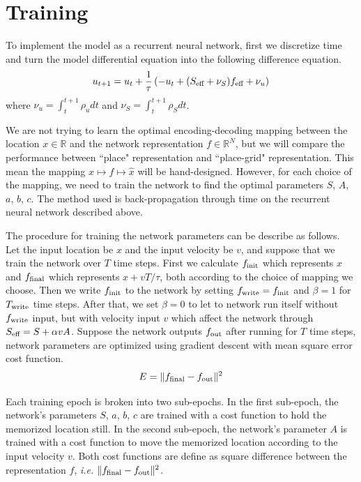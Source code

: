 \section{Training}
\label{sec:train}

To implement the model as a recurrent neural network, first we discretize time and turn the model differential equation into the following difference equation.
\begin{equation}
u_{t+1} = u_{t} + \frac{1}{\tau} \left(
    -u_{t} + (S_{\text{\scriptsize{eff}}} + \nu_S)
    f_{\text{\scriptsize{eff}}} + \nu_u
	\right)
\end{equation}
where $\nu_u = \int_{t}^{t+1} \rho_u dt$ and $\nu_S = \int_{t}^{t+1} \rho_S dt$.

We are not trying to learn the optimal encoding-decoding mapping between the location $x \in \mathbb{R}$ and the network representation $f \in \mathbb{R}^N$, but we will compare the performance between ``place" representation and ``place-grid" representation. This mean the mapping $x \mapsto f \mapsto \hat{x}$ will be hand-designed. However, for each choice of the mapping, we need to train the network to find the optimal parameters $S$, $A$, $a$, $b$, $c$. The method used is back-propagation through time on the recurrent neural network described above.

The procedure for training the network parameters can be describe as follows. Let the input location be $x$ and the input velocity be $v$, and suppose that we train the network over $T$ time steps. First we calculate $f_{\text{\scriptsize{init}}}$ which represents $x$ and $f_{\text{\scriptsize{final}}}$ which represents $x + vT/\tau$, both according to the choice of mapping we choose. Then we write $f_{\text{\scriptsize{init}}}$ to the network by setting $f_{\text{\scriptsize{write}}} = f_{\text{\scriptsize{init}}}$ and $\beta = 1$ for $T_{\text{\scriptsize{write}}}$ time steps. After that, we set $\beta = 0$ to let to network run itself without $f_{\text{\scriptsize{write}}}$ input, but with velocity input $v$ which affect the network through $S_{\text{\scriptsize{eff}}} = S + \alpha v A$. Suppose the network outputs $f_{\text{\scriptsize{out}}}$ after running for $T$ time steps, network parameters are optimized using gradient descent with mean square error cost function.
\begin{equation}
\label{eq:cost}
E = \|f_{\text{\scriptsize{final}}} - f_{\text{\scriptsize{out}}}\|^2
\end{equation}

Each training epoch is broken into two sub-epochs. In the first sub-epoch, the network's parameters $S$, $a$, $b$, $c$ are trained with a cost function to hold the memorized location still. In the second sub-epoch, the network's parameter $A$ is trained with a cost function to move the memorized location according to the input velocity $v$. Both cost functions are define as square difference between the representation $f$, \textit{i.e.} $\|f_{\text{\scriptsize{final}}} - f_{\text{\scriptsize{out}}}\|^2$.

